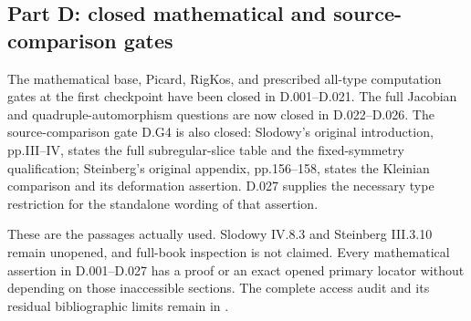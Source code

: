\subsection*{Part D: closed mathematical and source-comparison gates}
The mathematical base, Picard, RigKos, and prescribed all-type computation
gates at the first checkpoint have been closed in D.001--D.021.
The full Jacobian and quadruple-automorphism questions are now
closed in D.022--D.026.  The source-comparison gate D.G4 is
also closed: Slodowy's original introduction, pp.III--IV,
states the full subregular-slice table and the fixed-symmetry
qualification; Steinberg's original appendix, pp.156--158,
states the Kleinian comparison and its deformation assertion.
D.027 supplies the necessary type restriction for the
standalone wording of that assertion.

These are the passages actually used.  Slodowy IV.8.3
and Steinberg III.3.10 remain unopened, and full-book
inspection is not claimed.  Every mathematical assertion
in D.001--D.027 has a proof or an exact opened primary
locator without depending on those inaccessible sections.
The complete access audit and its residual bibliographic
limits remain in
.
